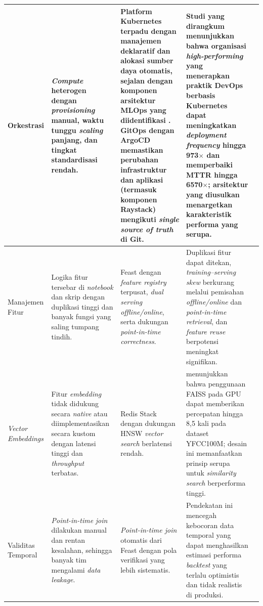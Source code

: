 {\begin{longtable}{|m{2cm}|m{2.5cm}|m{2.5cm}|m{3cm}|m{2cm}|}
Orkestrasi &
\textit{Compute} heterogen dengan \textit{provisioning} manual, waktu tunggu \textit{scaling} panjang, dan tingkat standardisasi rendah. &
Platform Kubernetes terpadu dengan manajemen deklaratif dan alokasi sumber daya otomatis, sejalan dengan komponen arsitektur MLOps yang diidentifikasi \textcite{kreuzberger2023mlops}. GitOps dengan ArgoCD memastikan perubahan infrastruktur dan aplikasi (termasuk komponen Raystack) mengikuti \textit{single source of truth} di Git. &
Studi yang dirangkum \textcite{lakka2025kubernetes} menunjukkan bahwa organisasi \textit{high-performing} yang menerapkan praktik DevOps berbasis Kubernetes dapat meningkatkan \textit{deployment frequency} hingga 973$\times$ dan memperbaiki MTTR hingga 6570$\times$; arsitektur yang diusulkan menargetkan karakteristik performa yang serupa. &
\autocite{kreuzberger2023mlops,lakka2025kubernetes} \\
\hline
Manajemen Fitur &
Logika fitur tersebar di \textit{notebook} dan skrip dengan duplikasi tinggi dan banyak fungsi yang saling tumpang tindih. &
Feast dengan \textit{feature registry} terpusat, \textit{dual serving} \textit{offline/online}, serta dukungan \textit{point-in-time correctness}. &
Duplikasi fitur dapat ditekan, \textit{training--serving skew} berkurang melalui pemisahan \textit{offline/online} dan \textit{point-in-time retrieval}, dan \textit{feature reuse} berpotensi meningkat signifikan. &
\autocite{munappy2022data,polyzotis2018data} \\
\hline
\textit{Vector Embeddings} &
Fitur \textit{embedding} tidak didukung secara \textit{native} atau diimplementasikan secara kustom dengan latensi tinggi dan \textit{throughput} terbatas. &
Redis Stack dengan dukungan HNSW \textit{vector search} berlatensi rendah. &
\textcite{johnson2021billion} menunjukkan bahwa penggunaan FAISS pada GPU dapat memberikan percepatan hingga 8{,}5 kali pada dataset YFCC100M; desain ini memanfaatkan prinsip serupa untuk \textit{similarity search} berperforma tinggi. &
\autocite{johnson2021billion} \\
\hline
Validitas Temporal &
\textit{Point-in-time} \textit{join} dilakukan manual dan rentan kesalahan, sehingga banyak tim mengalami \textit{data leakage}. &
\textit{Point-in-time join} otomatis dari Feast dengan pola verifikasi yang lebih sistematis. &
Pendekatan ini mencegah kebocoran data temporal yang dapat menghasilkan estimasi performa \textit{backtest} yang terlalu optimistis dan tidak realistis di produksi. &
\autocite{polyzotis2018data} \\

\end{longtable}}
